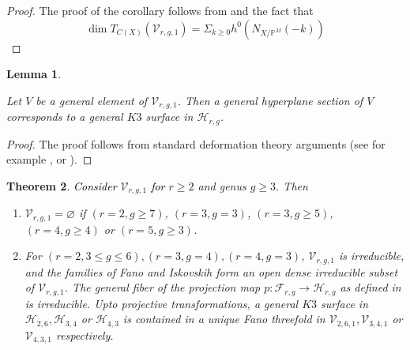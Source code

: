 \documentclass[11pt,twoside]{amsart}
\theoremstyle{plain}
\numberwithin{equation}{section}
\newtheorem{theorem}{Theorem}[section]
\newtheorem{lemma}[theorem]{Lemma}
\theoremstyle{definition}
\begin{document}
\begin{proof}
    The proof of the corollary follows from  and the fact that $$\operatorname{dim}T_{C(X)}(\mathcal{V}_{r,g,1}) = \Sigma_{k \geq 0} h^0(N_{X/\mathbb{P}^M}(-k))$$
\end{proof}

\begin{lemma}\label{hyperplane section of a general fano is a general K3}

Let $V$ be a general element of $\mathcal{V}_{r,g,1}$. Then a general hyperplane section of $V$ corresponds to a general $K3$ surface in $\mathcal{H}_{r,g}$.
    
\end{lemma}

\begin{proof}
    The proof follows from standard deformation theory arguments (see for example \cite[Lemma $3.7$]{CLM98}, or \cite{Bea02}).
\end{proof}

\begin{theorem}\label{classification of fanos with index two}
\textcolor{black}{Consider} $\mathcal{V}_{r,g,1}$ \textcolor{black}{for} $r \geq 2$ and genus $g \geq 3$. Then 
\begin{enumerate}
    \item $\mathcal{V}_{r,g,1} = \varnothing$ if $(r = 2, g \geq 7)$, $(r = 3, g = 3)$, $(r = 3, g \geq 5)$, $(r = 4, g \geq 4)$ or $(r = 5, g \geq 3)$. 
    \item For $(r = 2, 3 \leq g \leq 6), (r = 3, g = 4), (r = 4, g = 3)$, $\mathcal{V}_{r,g,1}$ is irreducible, and the families of Fano and Iskovskih form an open dense irreducible subset of $\mathcal{V}_{r,g,1}$. The general fiber of the projection map $p: \mathcal{F}_{r,g} \to \mathcal{H}_{r,g}$ as defined in  is irreducible. Upto projective transformations, a general $K3$ surface in $\mathcal{H}_{2,6}, \mathcal{H}_{3,4}$ or $ \mathcal{H}_{4,3}$ is contained in a unique Fano threefold in $\mathcal{V}_{2,6,1}, \mathcal{V}_{3,4,1}$ or $ \mathcal{V}_{4,3,1}$ respectively.
\end{enumerate}
\end{theorem}
\end{document}
